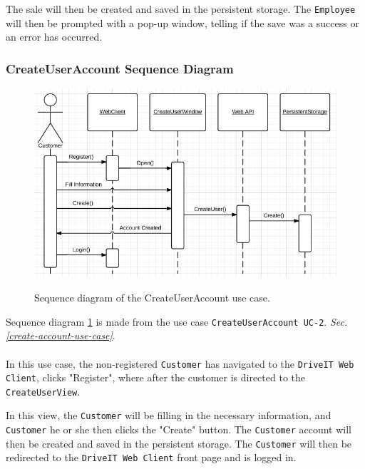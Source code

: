 The sale will then be created and saved in the persistent storage. The \texttt{Employee} will then be prompted with a pop-up window, telling if the save was a success or an error has occurred.

\subsubsection{CreateUserAccount Sequence Diagram}
\begin{figure}[H]
	\centering
		\includegraphics[width=\textwidth]{Figures/SequenceDiagram-CreateUserAccount}\\
	\caption{Sequence diagram of the CreateUserAccount use case.}
  \label{fig:SequenceDiagram-CreateUserAccount}
\end{figure}

Sequence diagram \ref{fig:SequenceDiagram-CreateUserAccount} is made from the use case \texttt{CreateUserAccount UC-2}. \textit{Sec. \ref{create-account-use-case}}. \\\\
In this use case, the non-registered \texttt{Customer} has navigated to the \texttt{DriveIT Web Client}, clicks "Register", where after the customer is directed to the \texttt{CreateUserView}. 

In this view, the \texttt{Customer} will be filling in the necessary information, and \texttt{Customer} he or she then clicks the "Create" button. The \texttt{Customer} account will then be created and saved in the persistent storage. The \texttt{Customer} will then be redirected to the \texttt{DriveIT Web Client} front page and is logged in.

